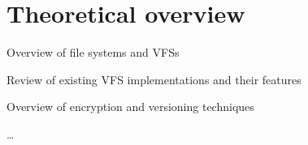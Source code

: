 \chapter{Theoretical overview}
\label{chap:refs}

Overview of file systems and VFSs

Review of existing VFS implementations and their features

Overview of encryption and versioning techniques

\ldots